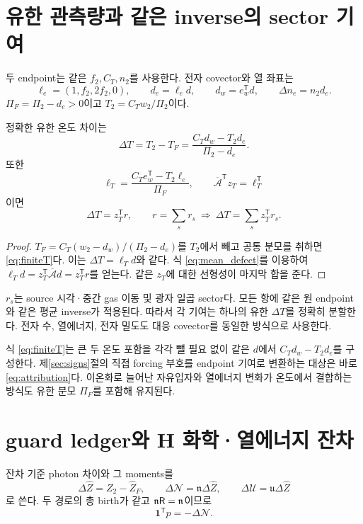 \section{유한 관측량과 같은 inverse의 sector 기여}\label{sec:observables}
두 endpoint는 같은 $f_2,C_T,n_2$를 사용한다. 전자 covector와 열 좌표는
\begin{equation}
\ell_e=(1,f_2,2f_2,0),\qquad
d_e=\ell_e d,\qquad d_w=e_w^{\mathsf T}d,\qquad
\Delta n_e=n_2d_e.
\label{eq:electron_defect}
\end{equation}
$\Pi_F=\Pi_2-d_e>0$이고 $T_2=C_Tw_2/\Pi_2$이다.

\begin{theorem}\label{thm:temperature}
정확한 유한 온도 차이는
\begin{equation}
\boxed{\Delta T=T_2-T_F
=\frac{C_Td_w-T_2d_e}{\Pi_2-d_e}.}
\label{eq:finiteT}
\end{equation}
또한
\begin{equation}
\ell_T=\frac{C_Te_w^{\mathsf T}-T_2\ell_e}{\Pi_F},\qquad
\overline{\mathcal A}^{\mathsf T}z_T=\ell_T^{\mathsf T}
\label{eq:adjoint}
\end{equation}
이면
\begin{equation}
\boxed{\Delta T=z_T^{\mathsf T}r,\qquad
r=\sum_s r_s\ \Longrightarrow\
\Delta T=\sum_s z_T^{\mathsf T}r_s.}
\label{eq:attribution}
\end{equation}
\end{theorem}
\begin{proof}
$T_F=C_T(w_2-d_w)/(\Pi_2-d_e)$를 $T_2$에서 빼고 공통 분모를 취하면
\eqref{eq:finiteT}다. 이는 $\Delta T=\ell_Td$와 같다.
식 \eqref{eq:mean_defect}를 이용하여
$\ell_Td=z_T^{\mathsf T}\overline{\mathcal A}d=z_T^{\mathsf T}r$를 얻는다.
같은 $z_T$에 대한 선형성이 마지막 합을 준다.
\end{proof}

$r_s$는 source 시각·중간 gas 이동 및 광자 일곱 sector다.
모든 항에 같은 원 endpoint와 같은 평균 inverse가 적용된다.
따라서 각 기여는 하나의 유한 $\Delta T$를 정확히 분할한다.
전자 수, 열에너지, 전자 밀도도 대응 covector를 동일한 방식으로 사용한다.

식 \eqref{eq:finiteT}는 큰 두 온도 포함을 각각 뺄 필요 없이
같은 $d$에서 $C_Td_w-T_2d_e$를 구성한다.
제\ref{sec:signs}절의 직접 forcing 부호를 endpoint 기여로 변환하는 대상은
바로 \eqref{eq:attribution}다.
이온화로 늘어난 자유입자와 열에너지 변화가 온도에서 결합하는 방식도
유한 분모 $\Pi_F$를 포함해 유지된다.

\section{guard ledger와 H 화학·열에너지 잔차}\label{sec:ledger}
잔차 기준 photon 차이와 그 moments를
\begin{equation}
\Delta\widehat Z=Z_2-\widehat Z_F,\qquad
\Delta\mathcal N=\mathfrak n\Delta\widehat Z,\qquad
\Delta\mathcal U=\mathfrak u\Delta\widehat Z
\label{eq:photon_moments}
\end{equation}
로 쓴다. 두 경로의 총 birth가 같고 $\mathfrak n\mathsf R=\mathfrak n$이므로
\begin{equation}
\boldsymbol1^{\mathsf T}p=-\Delta\mathcal N.
\label{eq:number_ledger}
\end{equation}

